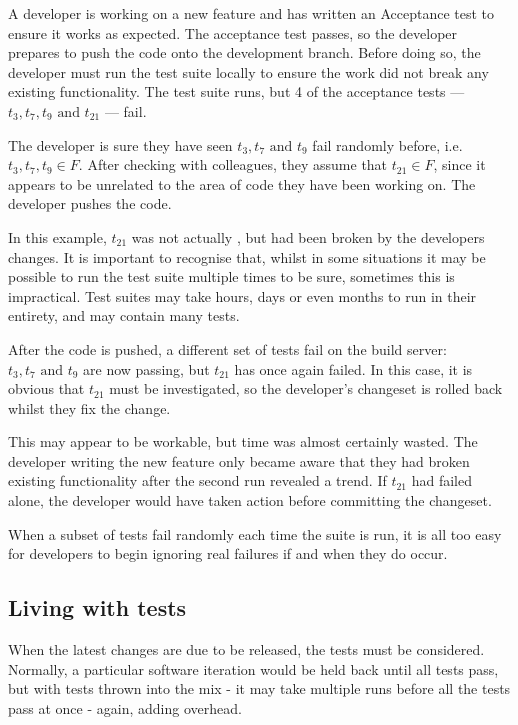 A developer is working on a new feature and has written an Acceptance test to
ensure it works as expected. The acceptance test passes, so the developer
prepares to push the code onto the development branch. Before doing so, the
developer must run the test suite locally to ensure the work did not break any
existing functionality. The test suite runs, but 4 of the acceptance tests ---
$t_{3}, t_{7}, t_{9} \text{ and } t_{21}$ --- fail.

The developer is sure they have seen $t_{3}, t_{7} \text{ and } t_{9}$ fail
randomly before, i.e. $t_{3}, t_{7}, t_{9} \in F$. After checking with
colleagues, they assume that $t_{21} \in F$, since it appears to be unrelated
to the area of code they have been working on. The developer pushes the code.

In this example, $t_{21}$ was not actually \flaky, but had been broken by the
developers changes. It is important to recognise that, whilst in some situations
it may be possible to run the test suite multiple times to be sure, sometimes
this is impractical. Test suites may take hours, days or even months to run in
their entirety, and may contain many \flaky tests.

After the code is pushed, a different set of tests fail on the build server:
$t_{3}, t_{7} \text{ and } t_{9}$ are now passing, but $t_{21}$ has once again
failed. In this case, it is obvious that $t_{21}$ must be investigated, so the
developer’s changeset is rolled back whilst they fix the change.

This may appear to be workable, but time was almost certainly wasted. The
developer writing the new feature only became aware that they had broken
existing functionality after the second run revealed a trend. If $t_{21}$ had
failed alone, the developer would have taken action before committing the
changeset.

When a subset of tests fail randomly each time the suite is run, it is all too
easy for developers to begin ignoring real failures if and when they do occur.


\subsection{Living with \flaky tests}

When the latest changes are due to be released, the \flaky tests must be
considered. Normally, a particular software iteration would be held back until
all tests pass, but with \flaky tests thrown into the mix - it may take multiple
runs before all the tests pass at once - again, adding overhead.

